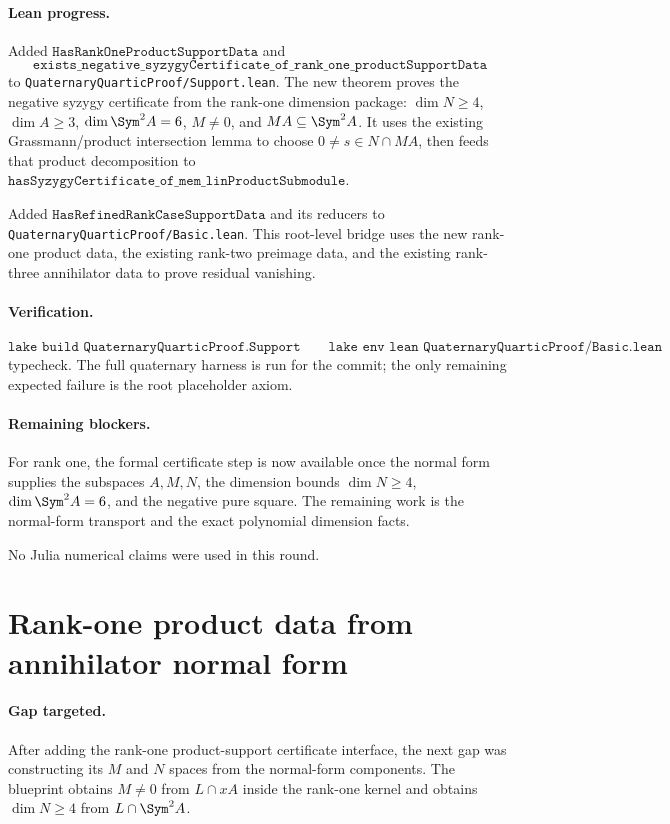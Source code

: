 \documentclass[11pt]{article}
\begin{document}
\paragraph{Lean progress.}
Added \(\texttt{HasRankOneProductSupportData}\) and
\[
\texttt{exists\_negative\_syzygyCertificate\_of\_rank\_one\_productSupportData}
\]
to \texttt{QuaternaryQuarticProof/Support.lean}.  The new theorem proves the
negative syzygy certificate from the rank-one dimension package:
\(\dim N\ge4\), \(\dim A\ge3\), \(\dim\Sym^2A=6\), \(M\ne0\), and
\(MA\subseteq\Sym^2A\).  It uses the existing Grassmann/product intersection
lemma to choose \(0\ne s\in N\cap MA\), then feeds that product decomposition
to \(\texttt{hasSyzygyCertificate\_of\_mem\_linProductSubmodule}\).

Added \(\texttt{HasRefinedRankCaseSupportData}\) and its reducers to
\texttt{QuaternaryQuarticProof/Basic.lean}.  This root-level bridge uses the
new rank-one product data, the existing rank-two preimage data, and the
existing rank-three annihilator data to prove residual vanishing.

\paragraph{Verification.}
\[
\texttt{lake build QuaternaryQuarticProof.Support}
\qquad
\texttt{lake env lean QuaternaryQuarticProof/Basic.lean}
\]
typecheck.  The full quaternary harness is run for the commit; the only
remaining expected failure is the root placeholder axiom.

\paragraph{Remaining blockers.}
For rank one, the formal certificate step is now available once the normal
form supplies the subspaces \(A,M,N\), the dimension bounds
\(\dim N\ge4\), \(\dim\Sym^2A=6\), and the negative pure square.  The remaining
work is the normal-form transport and the exact polynomial dimension facts.

No Julia numerical claims were used in this round.

\section*{Rank-one product data from annihilator normal form}

\paragraph{Gap targeted.}
After adding the rank-one product-support certificate interface, the next gap
was constructing its \(M\) and \(N\) spaces from the normal-form components.
The blueprint obtains \(M\ne0\) from \(L\cap xA\) inside the rank-one kernel
and obtains \(\dim N\ge4\) from \(L\cap\Sym^2A\).
\end{document}
